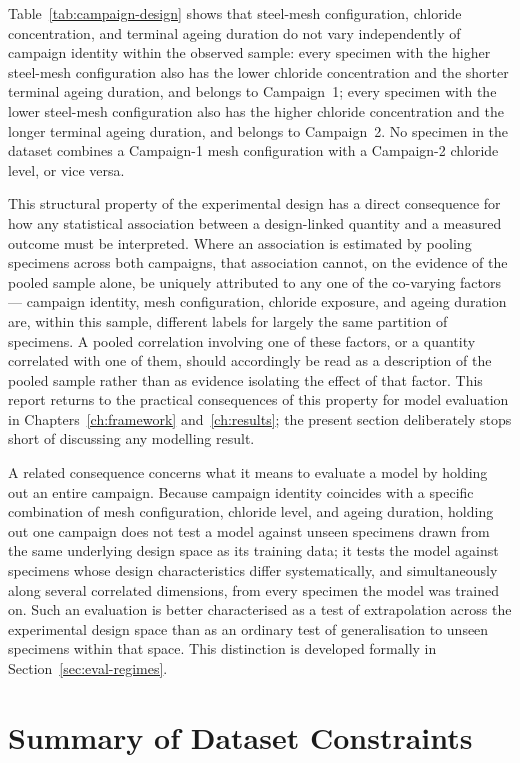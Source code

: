 Table~\ref{tab:campaign-design} shows that steel-mesh configuration,
chloride concentration, and terminal ageing duration do not vary
independently of campaign identity within the observed sample: every
specimen with the higher steel-mesh configuration also has the lower
chloride concentration and the shorter terminal ageing duration, and
belongs to Campaign~1; every specimen with the lower steel-mesh
configuration also has the higher chloride concentration and the longer
terminal ageing duration, and belongs to Campaign~2. No specimen in the
dataset combines a Campaign-1 mesh configuration with a Campaign-2
chloride level, or vice versa.

This structural property of the experimental design has a direct
consequence for how any statistical association between a design-linked
quantity and a measured outcome must be interpreted. Where an association
is estimated by pooling specimens across both campaigns, that association
cannot, on the evidence of the pooled sample alone, be uniquely attributed
to any one of the co-varying factors — campaign identity, mesh
configuration, chloride exposure, and ageing duration are, within this
sample, different labels for largely the same partition of specimens. A
pooled correlation involving one of these factors, or a quantity correlated
with one of them, should accordingly be read as a description of the
pooled sample rather than as evidence isolating the effect of that factor.
This report returns to the practical consequences of this property for
model evaluation in Chapters~\ref{ch:framework} and~\ref{ch:results}; the
present section deliberately stops short of discussing any modelling
result.

A related consequence concerns what it means to evaluate a model by
holding out an entire campaign. Because campaign identity coincides with a
specific combination of mesh configuration, chloride level, and ageing
duration, holding out one campaign does not test a model against unseen
specimens drawn from the same underlying design space as its training
data; it tests the model against specimens whose design characteristics
differ systematically, and simultaneously along several correlated
dimensions, from every specimen the model was trained on. Such an
evaluation is better characterised as a test of extrapolation across the
experimental design space than as an ordinary test of generalisation to
unseen specimens within that space. This distinction is developed formally
in Section~\ref{sec:eval-regimes}.

\section{Summary of Dataset Constraints}
\label{sec:dataset-summary}

